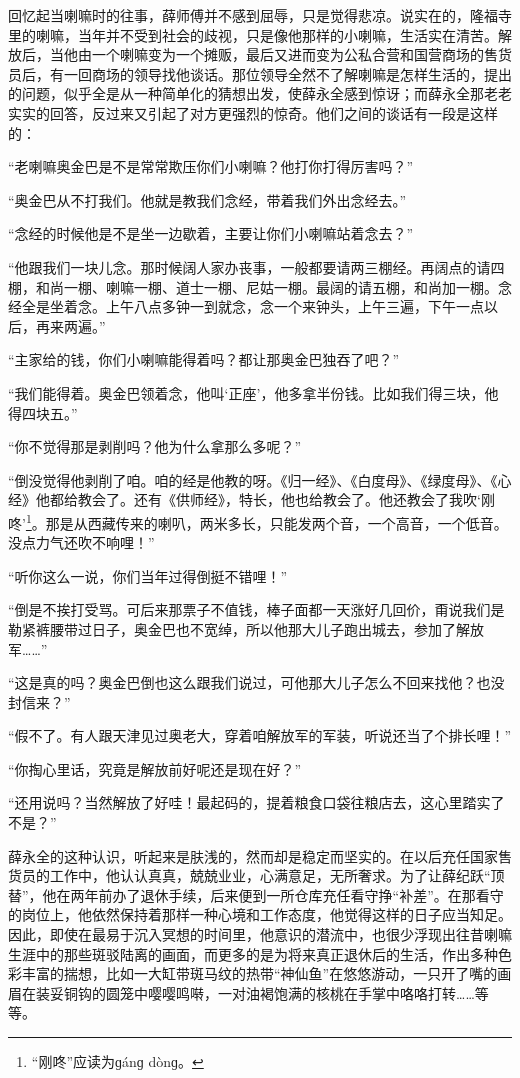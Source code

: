 \par 回忆起当喇嘛时的往事，薛师傅并不感到屈辱，只是觉得悲凉。说实在的，隆福寺里的喇嘛，当年并不受到社会的歧视，只是像他那样的小喇嘛，生活实在清苦。解放后，当他由一个喇嘛变为一个摊贩，最后又进而变为公私合营和国营商场的售货员后，有一回商场的领导找他谈话。那位领导全然不了解喇嘛是怎样生活的，提出的问题，似乎全是从一种简单化的猜想出发，使薛永全感到惊讶；而薛永全那老老实实的回答，反过来又引起了对方更强烈的惊奇。他们之间的谈话有一段是这样的：
\par “老喇嘛奥金巴是不是常常欺压你们小喇嘛？他打你打得厉害吗？”
\par “奥金巴从不打我们。他就是教我们念经，带着我们外出念经去。”
\par “念经的时候他是不是坐一边歇着，主要让你们小喇嘛站着念去？”
\par “他跟我们一块儿念。那时候阔人家办丧事，一般都要请两三棚经。再阔点的请四棚，和尚一棚、喇嘛一棚、道士一棚、尼姑一棚。最阔的请五棚，和尚加一棚。念经全是坐着念。上午八点多钟一到就念，念一个来钟头，上午三遍，下午一点以后，再来两遍。”
\par “主家给的钱，你们小喇嘛能得着吗？都让那奥金巴独吞了吧？”
\par “我们能得着。奥金巴领着念，他叫‘正座’，他多拿半份钱。比如我们得三块，他得四块五。”
\par “你不觉得那是剥削吗？他为什么拿那么多呢？”
\par “倒没觉得他剥削了咱。咱的经是他教的呀。《归一经》、《白度母》、《绿度母》、《心经》他都给教会了。还有《供师经》，特长，他也给教会了。他还教会了我吹‘刚咚’\footnote{“刚咚”应读为ɡánɡ dònɡ。}。那是从西藏传来的喇叭，两米多长，只能发两个音，一个高音，一个低音。没点力气还吹不响哩！”
\par “听你这么一说，你们当年过得倒挺不错哩！”
\par “倒是不挨打受骂。可后来那票子不值钱，棒子面都一天涨好几回价，甭说我们是勒紧裤腰带过日子，奥金巴也不宽绰，所以他那大儿子跑出城去，参加了解放军……”
\par “这是真的吗？奥金巴倒也这么跟我们说过，可他那大儿子怎么不回来找他？也没封信来？”
\par “假不了。有人跟天津见过奥老大，穿着咱解放军的军装，听说还当了个排长哩！”
\par “你掏心里话，究竟是解放前好呢还是现在好？”
\par “还用说吗？当然解放了好哇！最起码的，提着粮食口袋往粮店去，这心里踏实了不是？”
\par 薛永全的这种认识，听起来是肤浅的，然而却是稳定而坚实的。在以后充任国家售货员的工作中，他认认真真，兢兢业业，心满意足，无所奢求。为了让薛纪跃“顶替”，他在两年前办了退休手续，后来便到一所仓库充任看守挣“补差”。在那看守的岗位上，他依然保持着那样一种心境和工作态度，他觉得这样的日子应当知足。因此，即使在最易于沉入冥想的时间里，他意识的潜流中，也很少浮现出往昔喇嘛生涯中的那些斑驳陆离的画面，而更多的是为将来真正退休后的生活，作出多种色彩丰富的揣想，比如一大缸带斑马纹的热带“神仙鱼”在悠悠游动，一只开了嘴的画眉在装妥铜钩的圆笼中嘤嘤鸣啭，一对油褐饱满的核桃在手掌中咯咯打转……等等。
